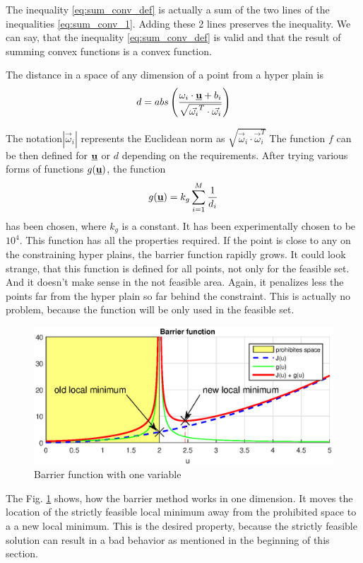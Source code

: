 \documentclass[a4paper,11pt,titlepage]{article}
\newcommand{\uvec}{\textbf{\underline{u}}}
\newcommand{\macoi}{\vec{\omega}_i}
\begin{document}
The inequality \ref{eq:sum_conv_def} is actually a sum of the two lines of the inequalities \ref{eq:sum_conv_1}. Adding these 2 lines preserves the inequality. We can say, that the inequality \ref{eq:sum_conv_def} is valid and that the result of summing convex functions is a convex function. 

The distance in a space of any dimension of a point from a hyper plain is 
\begin{equation}
\label{eq:plain_distance}
d = abs\left(\frac{\omega_i \cdot \uvec + b_i}{\sqrt{\vec{\omega_i}^T \cdot \vec{\omega_i}}}\right)
\end{equation}

The notation$|\macoi|$ represents the Euclidean norm as $\sqrt{\macoi \cdot \macoi^T}$ The function $f$ can be then defined for $\uvec$ or $d$ depending on the requirements. After trying various forms of functions $g(\uvec)$, the function
\begin{equation}
\label{eq:barrier_function}
g(\uvec) = k_g\sum_{i = 1}^M \frac{1}{d_i} 
\end{equation}
has been chosen, where $k_g$ is a constant. It has been experimentally chosen to be $10^4$. This function has all the properties required. If the point is close to any on the constraining hyper plains, the barrier function rapidly grows. It could look strange, that this function is defined for all  points, not only for the feasible set. And it doesn't make sense in the not feasible area. Again, it penalizes less the points far from the hyper plain so far behind the constraint. This is actually no problem, because the function will be only used in the feasible set. 
\begin{figure}[h]
\centering
\includegraphics[width=1\textwidth]{fig/barrier_function2.eps}
\caption{Barrier function with one variable}
\label{fig:barrier_function}
\end{figure}

The Fig. \ref{fig:barrier_function} shows, how the barrier method works in one dimension. It moves the location of the strictly feasible local minimum away from the prohibited space to a a new local minimum. This is the desired property, because the strictly feasible solution can result in a bad behavior as mentioned in the beginning of this section. 
\end{document}
